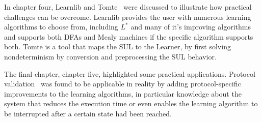 \documentclass[multi,crop=false,class=article]{standalone}
\begin{document}
In chapter four, Learnlib
and Tomte~\cite{Raffelt2009,Tomte2014} were discussed to illustrate how practical
challenges can be overcome. Learnlib provides the user with numerous learning
algorithms to choose from, including $L^*$ and many of it's improving algorithms
and supports both DFAs and Mealy machines if the specific algorithm supports both.
Tomte is a tool that maps the SUL to the Learner, by first solving nondeterminism
by conversion and preprocessing the SUL behavior.


The final chapter, chapter
five, highlighted some practical applications.
Protocol validation~\cite{deRuiter2015} was found to be applicable in reality by
adding protocol-specific improvements to the learning algorithms, in particular
knowledge about the system that reduces the execution time or even enables the
learning algorithm to be interrupted after a certain state had been reached.
\end{document}
